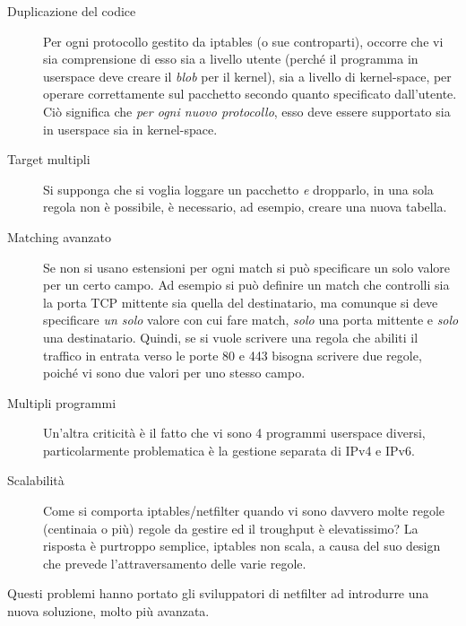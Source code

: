 \begin{description}
  \item[Duplicazione del codice]Per ogni protocollo gestito da iptables (o sue
  controparti), occorre che vi sia comprensione di esso sia a livello
  utente (perché il programma in userspace deve creare il \textit{blob} per
  il kernel), sia a livello di kernel-space, per operare correttamente sul pacchetto
  secondo quanto specificato dall'utente.\\
  Ciò significa che \textit{per ogni nuovo protocollo}, esso deve essere
  supportato sia in userspace sia in kernel-space.
  \item[Target multipli]Si supponga che si voglia loggare un pacchetto
  \textit{e} dropparlo, in una sola regola non è possibile, è necessario, ad
  esempio, creare una nuova tabella.
  \item[Matching avanzato]Se non si usano estensioni per ogni match si può specificare
  un solo valore per un certo campo. Ad esempio si può definire un match che controlli
  sia la porta TCP mittente sia quella del destinatario, ma comunque si
  deve specificare \textit{un solo} valore con cui fare match, \textit{solo} una porta mittente
  e \textit{solo} una destinatario.
  Quindi, se si vuole scrivere una regola che abiliti il traffico in entrata verso
  le porte 80 e 443 bisogna scrivere due regole, poiché vi sono due valori per uno stesso campo.
  \item[Multipli programmi]Un'altra criticità è il fatto che vi sono 4 programmi
  userspace diversi, particolarmente problematica è la gestione separata di IPv4
  e IPv6.
  \item[Scalabilità]Come si comporta iptables/netfilter quando vi sono
  davvero molte regole (centinaia o più) regole da gestire ed il troughput
  è elevatissimo? La risposta è purtroppo semplice, iptables non scala, a causa
  del suo design che prevede l'attraversamento delle varie regole.
\end{description}

Questi problemi hanno portato gli sviluppatori di netfilter ad introdurre
una nuova soluzione, molto più avanzata.
